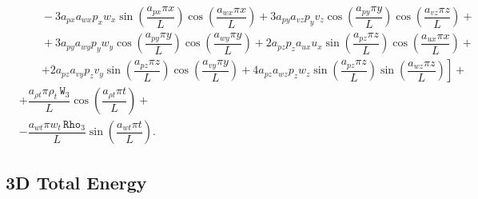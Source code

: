 \documentclass[10pt]{article}
\newcommand{\Rho}{\,\mathtt{Rho}}
\newcommand{\W}{\,\mathtt{W}}
\begin{document}
\begin{equation}
\begin{split}
    &\qquad-3 a_{px} a_{wx} p_x w_x \sin\left(\dfrac{a_{px} \pi x}{L}\right) \cos\left(\dfrac{a_{wx} \pi x}{L}\right)+3 a_{py} a_{vz} p_y v_z \cos\left(\dfrac{a_{py} \pi y}{L}\right) \cos\left(\dfrac{a_{vz} \pi z}{L}\right)+\\
    &\qquad+3 a_{py} a_{wy} p_y w_y \cos\left(\dfrac{a_{py} \pi y}{L}\right) \cos\left(\dfrac{a_{wy} \pi y}{L}\right)+2 a_{pz} p_z a_{ux} u_x \sin\left(\dfrac{a_{pz} \pi z}{L}\right) \cos\left(\dfrac{a_{ux} \pi x}{L}\right)+\\
    &\qquad\left.+2 a_{pz} a_{vy}  p_z v_y \sin\left(\dfrac{a_{pz} \pi z}{L}\right) \cos\left(\dfrac{a_{vy} \pi y}{L}\right)+4 a_{pz} a_{wz} p_z w_z \sin\left(\dfrac{a_{pz} \pi z}{L}\right) \sin\left(\dfrac{a_{wz} \pi z}{L}\right)\right]+\\
&+\dfrac{a_{\rho t} \pi \rho_t \W_3 }{L}\cos\left(\dfrac{a_{\rho t} \pi t}{L}\right)+\\
&-\dfrac{a_{wt} \pi w_t  \Rho_3 }{L}\sin\left(\dfrac{a_{wt} \pi t}{L}\right).
 \end{split}
\end{equation}

\subsection{3D Total Energy}
\end{document}

